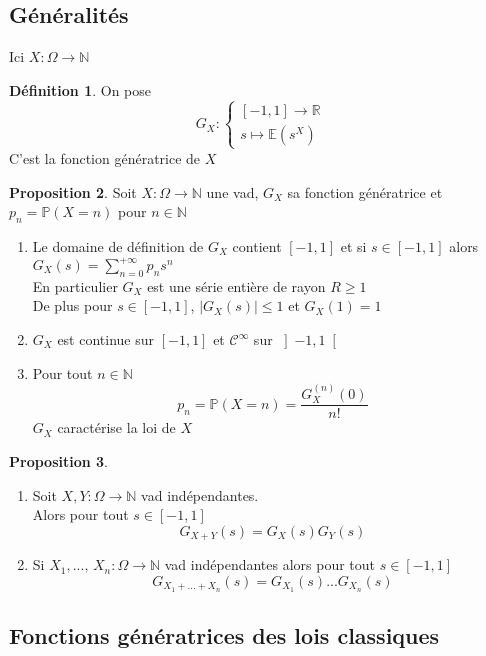 \documentclass[10pt,a4paper]{article}
\theoremstyle{definition}
\newtheorem{proposition}{Proposition}[section]
\newtheorem{definition}[proposition]{Définition}
\begin{document}
\subsection{Généralités}
\noindent Ici \(X: \Omega \to \mathbb{N}\)
\begin{definition}
    On pose \[G_X: \begin{cases} 
    [-1, 1] \to \mathbb{R} \\
    s \mapsto \mathbb{E}(s^X) \end{cases}\]
    C'est la fonction génératrice de \(X\)
\end{definition}
\begin{proposition}
    Soit \(X: \Omega \to \mathbb{N}\) une vad, \(G_X\) sa fonction génératrice et \(p_n = \mathbb{P}(X = n)\) pour \(n \in \mathbb{N}\)
    \begin{enumerate}
        \item Le domaine de définition de \(G_X\) contient \([-1, 1]\) et si \(s \in [-1, 1]\) alors \(G_X(s) = \sum\limits_{n = 0}^{+\infty}p_n s^n\) \\
        En particulier \(G_X\) est une série entière de rayon \(R \geq 1\) \\
        De plus pour \(s \in [-1, 1]\), \(|G_X(s)| \leq 1\) et \(G_X(1) = 1\)
        \item \(G_X\) est continue sur \([-1, 1]\) et \(\mathcal{C}^{\infty}\) sur \(\left] -1, 1 \right[\)
        \item Pour tout \(n \in \mathbb{N}\)
        \[\boxed{p_n = \mathbb{P}(X = n) = \frac{G_X^{(n)}(0)}{n!}}\]
        \(G_X\) caractérise la loi de \(X\)
    \end{enumerate}
\end{proposition}
\begin{proposition}
    \hfill \begin{enumerate}
        \item Soit \(X, Y: \Omega \to \mathbb{N}\) vad indépendantes. \\
        Alors pour tout \(s \in [-1, 1]\)
        \[\boxed{G_{X + Y}(s) = G_X(s) G_Y(s)}\]
        \item Si \(X_1, ...,\, X_n: \Omega \to \mathbb{N}\) vad indépendantes alors pour tout \(s \in [-1, 1]\)
        \[\boxed{G_{X_1 + ... + X_n}(s) = G_{X_1}(s) ... G_{X_n}(s)}\] 
    \end{enumerate}
\end{proposition}

\subsection{Fonctions génératrices des lois classiques}
\end{document}
